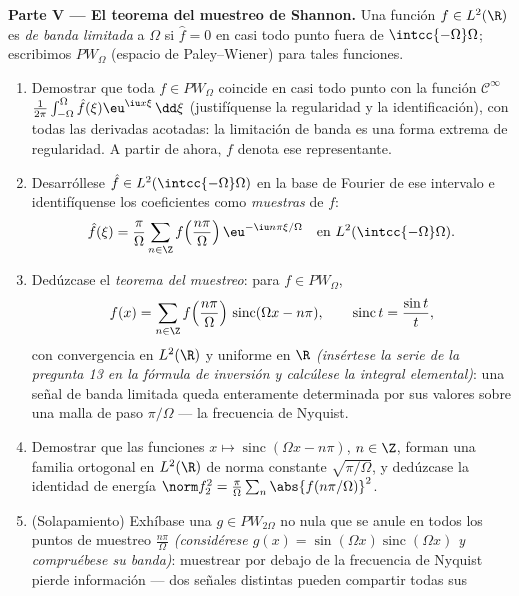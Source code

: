 \begin{problem}[{Problema de fin de semana --- $\partial_tu =
\partial^2_{xx}u$, resuelta de principio a fin}]
\medskip
\noindent\textbf{Parte V --- El teorema del muestreo de Shannon.} Una
función $f \in L^2(\R)$ es \emph{de banda limitada} a $\Omega$ si
$\hat f = 0$ en casi todo punto fuera de $\intcc{-\Omega}\Omega$;
escribimos $PW_\Omega$ (espacio de Paley--Wiener) para tales funciones.
\begin{enumerate}[resume]
  \item Demostrar que toda $f \in PW_\Omega$ coincide en casi todo punto
  con la función $\mathcal C^\infty$
  $\frac1{2\pi}\int_{-\Omega}^{\Omega}\hat
        f(\xi)\eu^{\iu x\xi}\,\dd\xi$ (justifíquense la regularidad y la
  identificación), con todas las derivadas acotadas: la limitación de
  banda es una forma extrema de regularidad. A partir de ahora, $f$
  denota ese representante. \item Desarróllese
  $\hat f \in L^2(\intcc{-\Omega}\Omega)$ en la base de Fourier de ese
  intervalo e identifíquense los coeficientes como \emph{muestras} de
  $f$:
        \[
        \hat f(\xi) = \frac\pi\Omega\sum_{n\in\Z}
        f\Bigl(\frac{n\pi}\Omega\Bigr)\,
        \eu^{-\iu n\pi\xi/\Omega}
        \quad\text{en } L^2(\intcc{-\Omega}\Omega) .
        \]
  \item Dedúzcase el \emph{teorema del muestreo}: para $f \in
        PW_\Omega$,
        \[
        f(x) = \sum_{n\in\Z}f\Bigl(\frac{n\pi}
        \Omega\Bigr)\,\operatorname{sinc}(\Omega x - n\pi),
        \qquad \operatorname{sinc}t = \frac{\sin t}t,
        \]
        con convergencia en $L^2(\R)$ y uniforme en $\R$
        \emph{(insértese la serie de la pregunta 13 en la fórmula de
        inversión y calcúlese la integral elemental)}: una señal de
        banda limitada queda enteramente determinada por sus valores
        sobre una malla de paso $\pi/\Omega$ --- la frecuencia de
        Nyquist. \item Demostrar que las funciones $x \mapsto
        \operatorname{sinc}(\Omega x - n\pi)$, $n \in \Z$, forman una
        familia ortogonal en $L^2(\R)$ de norma constante
        $\sqrt{\pi/\Omega}$, y dedúzcase la identidad de energía
        $\norm f_2^2 =
        \frac\pi\Omega\sum_n\abs{f(n\pi/\Omega)}^2$. \item
        (Solapamiento) Exhíbase una $g \in PW_{2\Omega}$ no nula que se
        anule en todos los puntos de muestreo $\frac{n\pi}\Omega$
        \emph{(considérese $g(x) =
        \sin(\Omega x)\operatorname{sinc}(\Omega x)$ y compruébese su
        banda)}: muestrear por debajo de la frecuencia de Nyquist pierde
        información --- dos señales distintas pueden compartir todas sus

\end{enumerate}
\end{problem}
